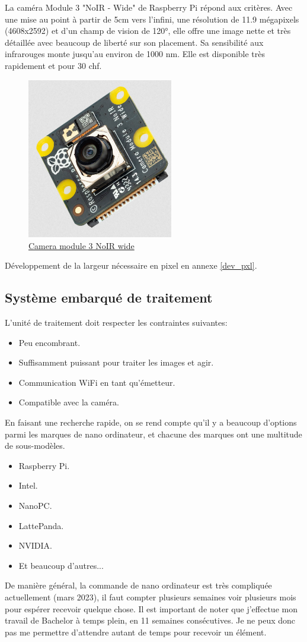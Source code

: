 La caméra Module 3 "NoIR - Wide" de Raspberry Pi \cite{camera} répond aux critères. Avec une mise au point à partir de 5cm vers l'infini,
une résolution de 11.9 mégapixels (4608x2592) et d'un champ de vision de \ang{120}, elle offre une image nette et très détaillée avec beaucoup de liberté sur
son placement. Sa sensibilité aux infrarouges monte jusqu'au environ de 1000 \si{\nano\metre}. Elle est disponible très rapidement et pour 30 \gls{chf}.
\begin{figure}[H]
    \centering
    \includegraphics[height=7cm,angle=-90]{assets/figures/camera.png}
    \caption{\href{https://www.digikey.ch/en/products/detail/raspberry-pi/SC0875/17278642}{Camera module 3 NoIR wide}}
\end{figure}
Développement de la largeur nécessaire en pixel en annexe \ref{dev_pxl}.
\newpage
\subsection{Système embarqué de traitement}
L'unité de traitement doit respecter les contraintes suivantes:
\begin{itemize}
    \item Peu encombrant.
    \item Suffisamment puissant pour traiter les images et agir.
    \item Communication WiFi en tant qu'émetteur.
    \item Compatible avec la caméra.
\end{itemize}
En faisant une recherche rapide, on se rend compte qu'il y a beaucoup d'options parmi les marques de nano ordinateur,
et chacune des marques ont une multitude de sous-modèles.
\begin{itemize}
    \item Raspberry Pi.
    \item Intel.
    \item NanoPC.
    \item LattePanda.
    \item NVIDIA.
    \item Et beaucoup d'autres...
\end{itemize}
De manière général, la commande de nano ordinateur est très compliquée actuellement (mars 2023), il faut compter plusieurs semaines voir plusieurs mois
pour espérer recevoir quelque chose. Il est important de noter que j'effectue mon travail de Bachelor à temps plein, en 11 semaines consécutives.
Je ne peux donc pas me permettre d'attendre autant de temps pour recevoir un élément.

